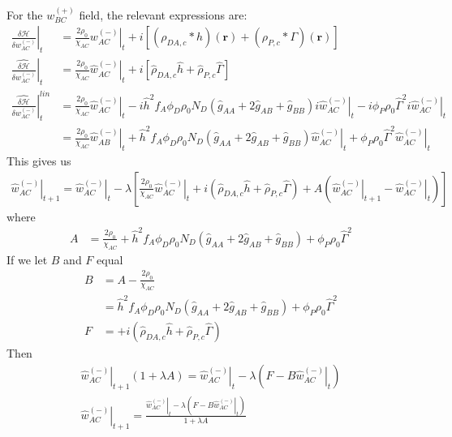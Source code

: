 \documentclass{article}
\begin{document}
  For the $w_{BC}^{(+)}$ field, the relevant expressions are:
  \begin{align*}
    \left. \frac{\delta \mathcal{H}}{\delta  w_{AC}^{(-)} } \right|_t &=
      \frac{2\rho_0}{\chi_{AC}} \left. w_{AC}^{(-)} \right|_t
      + i [ (\rho_{DA,c} \ast h)(\mathbf{r})
            + (\rho_{P,c} \ast \Gamma)(\mathbf{r}) ] \\
      \left. \hat{\frac{\delta \mathcal{H}}{\delta w_{AC}^{(-)}}} \right|_t &=
      \frac{2\rho_0}{\chi_{AC}} \left. \hat{w}_{AC}^{(-)} \right|_t
      + i [ \hat{\rho}_{DA,c} \hat{h}
            + \hat{\rho}_{P,c}  \hat{\Gamma} ] \\
    \left. \hat{\frac{\delta \mathcal{H}}{\delta w_{AC}^{(-)}}} \right| ^{lin}_t &=
      \frac{2\rho_0}{\chi_{AC}} \left. \hat{w}_{AC}^{(-)} \right|_t
      - i \hat{h}^2 f_A \phi_D \rho_0 N_D
        (\hat{g}_{AA} + 2 \hat{g}_{AB} + \hat{g}_{BB}) i \left.
          \hat{w}_{AC}^{(-)} \right|_t
      - i \phi_P \rho_0 \hat{\Gamma}^2 i \left. \hat{w}_{AC}^{(-)} \right|_t \\
    &= \frac{2\rho_0}{\chi_{AC}} \left. \hat{w}_{AB}^{(-)} \right|_t
      + \hat{h}^2 f_A \phi_D \rho_0 N_D
        (\hat{g}_{AA} + 2 \hat{g}_{AB} + \hat{g}_{BB})
          \left. \hat{w}_{AC}^{(-)} \right|_t
      + \phi_P \rho_0 \hat{\Gamma}^2 \left. \hat{w}_{AC}^{(-)} \right|_t
  \end{align*}
  This gives us
  \begin{align*}
    \left. \hat{w}_{AC}^{(-)} \right|_{t+1} =
      \left. \hat{w}_{AC}^{(-)} \right|_t - \lambda \left[
        \frac{2\rho_0}{\chi_{AC}} \left. \hat{w}_{AC}^{(-)} \right|_t
        + i ( \hat{\rho}_{DA,c} \hat{h}
              + \hat{\rho}_{P,c}  \hat{\Gamma} )
        + A ( \left. \hat{w}_{AC}^{(-)} \right|_{t+1}
              - \left. \hat{w}_{AC}^{(-)} \right|_t)
      \right]
  \end{align*}
  where
  \begin{align*}
    A &=
    \frac{2\rho_0}{\chi_{AC}}
        + \hat{h}^2 f_A \phi_D \rho_0 N_D
          (\hat{g}_{AA} + 2 \hat{g}_{AB} + \hat{g}_{BB})
        + \phi_P \rho_0 \hat{\Gamma}^2
  \end{align*}
  If we let $B$ and $F$ equal
  \begin{align*}
    B &= A - \frac{2\rho_0}{\chi_{AC}} \\
      &= \hat{h}^2 f_A \phi_D \rho_0 N_D
          (\hat{g}_{AA} + 2 \hat{g}_{AB} + \hat{g}_{BB})
        + \phi_P \rho_0 \hat{\Gamma}^2 \\
    F &= + i ( \hat{\rho}_{DA,c} \hat{h}
              + \hat{\rho}_{P,c}  \hat{\Gamma} )
  \end{align*}
  Then
  \begin{align*}
    \left. \hat{w}_{AC}^{(-)} \right|_{t+1} ( 1 + \lambda A ) =
      \left. \hat{w}_{AC}^{(-)} \right|_t
      - \lambda \left( F - B \left. \hat{w}_{AC}^{(-)} \right|_t \right) \\
    \left. \hat{w}_{AC}^{(-)} \right|_{t+1} =
    \frac{\left. \hat{w}_{AC}^{(-)} \right|_t - \lambda
            \left( F - B \left. \hat{w}_{AC}^{(-)} \right|_t \right)}
         {1 + \lambda A}
  \end{align*}
  
\end{document}
